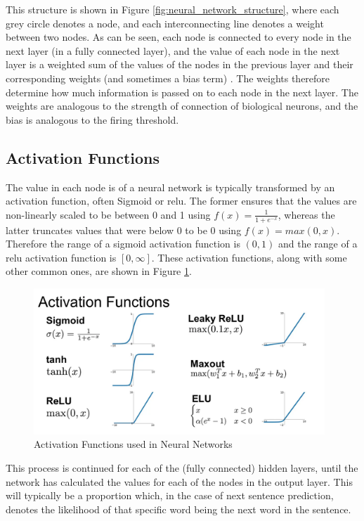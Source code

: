 This structure is shown in Figure \ref{fig:neural_network_structure}, where each grey circle denotes a node, and each interconnecting line denotes a weight between two nodes. As can be seen, each node is connected to every node in the next layer (in a fully connected layer), and the value of each node in the next layer is a weighted sum of the values of the nodes in the previous layer and their corresponding weights (and sometimes a bias term) \citep{Bishop}. The weights therefore determine how much information is passed on to each node in the next layer. The weights are analogous to the strength of connection of biological neurons, and the bias is analogous to the firing threshold.

\subsection{Activation Functions}
\label{sec:background_anns_activation_functions}

The value in each node is of a neural network is typically transformed by an activation function, often Sigmoid or \acrfull{relu}. The former ensures that the values are non-linearly scaled to be between 0 and 1 using $f(x) = \frac{1}{1+e^{-x}}$, whereas the latter truncates values that were below 0 to be 0 using $f(x) = max(0, x)$. Therefore the range of a sigmoid activation function is $(0, 1)$ and the range of a \acrshort{relu} activation function is $[0, \infty]$. These activation functions, along with some other common ones, are shown in Figure \ref{fig:activation_functions}.

\begin{figure}[h]
    \centering
    \includegraphics[height=5.5cm,trim={0 0 0 3.5cm},clip]{Paper/images/activation_functions.png}
    \caption{Activation Functions used in Neural Networks \citep{Udofia}}
    \label{fig:activation_functions}
\end{figure}

This process is continued for each of the (fully connected) hidden layers, until the network has calculated the values for each of the nodes in the output layer. This will typically be a proportion which, in the case of next sentence prediction, denotes the likelihood of that specific word being the next word in the sentence.

